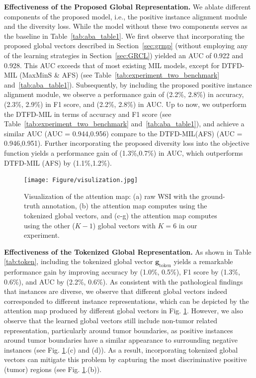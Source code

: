 \documentclass[runningheads]{llncs}
\begin{document}
\noindent\textbf{Effectiveness of the Proposed Global Representation.} 
We ablate different components of the proposed model, i.e., the positive instance alignment module and the diversity loss. While the model without these two components serves as the baseline in Table~\ref{tab:aba_table1}.
We first observe that incorporating the proposed global vectors described in Section~\ref{sec:grmp}
(without employing any of the learning strategies in Section~\ref{sec:GRCL}) yielded an AUC of 0.922 and 0.928. This AUC exceeds that of most existing MIL models, except for DTFD-MIL (MaxMinS \& AFS) (see Table~\ref{tab:experiment_two_benchmark} and~\ref{tab:aba_table1}). 
Subsequently, by including the proposed positive instance alignment module, we observe a performance gain of (2.2\%, 2.8\%) in accuracy, (2.3\%, 2.9\%) in F1 score, and (2.2\%, 2.8\%) in AUC. Up to now, we outperform the DTFD-MIL in terms of accuracy and F1 score (see Table~\ref{tab:experiment_two_benchmark} and~\ref{tab:aba_table1}), and achieve a similar AUC (AUC = 0.944,0.956) compare to the DTFD-MIL(AFS) (AUC = 0.946,0.951). Further incorporating the proposed diversity loss into the objective function yields a performance gain of (1.3\%,0.7\%) in AUC, which outperforms DTFD-MIL (AFS) by (1.1\%,1.2\%). 


\begin{figure}[!t]
\centering
\texttt{[image: Figure/visulization.jpg]} %
\caption{Visualization of the attention map: (a) raw WSI with the ground-truth annotation, (b) the attention map computes using the tokenized global vectors, and (c-g) the attention map computes using the other ($K-1$) global vectors with $K=6$ in our experiment. }
\label{fig:visulization}
\vspace{-0.3cm}
\end{figure}

\noindent\textbf{Effectiveness of the Tokenized Global Representation.} As shown in Table \ref{tab:token}, including the tokenized global vector $\boldsymbol{g}_{\operatorname{token}}$ yields a remarkable performance gain by improving accuracy by (1.0\%, 0.5\%), F1 score by (1.3\%, 0.6\%), and AUC by (2.2\%, 0.6\%). As consistent with the pathological findings that instances are diverse, we observe that different global vectors indeed corresponded to different instance representations, which can be depicted by the attention map produced by different global vectors in Fig. \ref{fig:visulization}. 
However, we also observe that the learned global vectors still include non-tumor related representation, particularly around tumor boundaries, as positive instances around tumor boundaries have a similar appearance to surrounding negative instances (see Fig. \ref{fig:visulization}.(c) and (d)). As a result, incorporating tokenized global vectors can mitigate this problem by capturing the most discriminative positive (tumor) regions (see Fig. \ref{fig:visulization}.(b)). 
\end{document}
